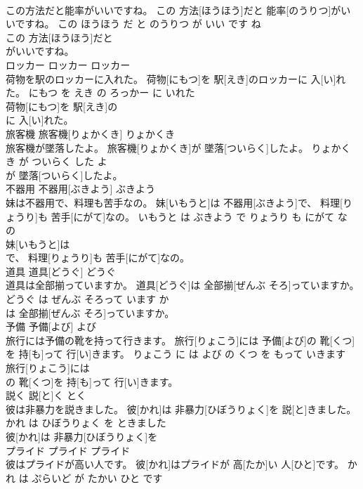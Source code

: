 \documentclass[8pt]{extreport}
\begin{document}
\begin{CJK}{UTF8}{min}
\\	この方法だと能率がいいですね。	この 方法[ほうほう]だと 能率[のうりつ]がいいですね。	この ほうほう だ と のうりつ が いい です ね	
\\	この 方法[ほうほう]だと
\\	がいいですね。			
\\	ロッカー	ロッカー	ロッカー	
\\	荷物を駅のロッカーに入れた。	荷物[にもつ]を 駅[えき]のロッカーに 入[い]れた。	にもつ を えき の ろっかー に いれた	
\\	荷物[にもつ]を 駅[えき]の
\\	に 入[い]れた。			
\\	旅客機	旅客機[りょかくき]	りょかくき	
\\	旅客機が墜落したよ。	旅客機[りょかくき]が 墜落[ついらく]したよ。	りょかくき が ついらく した よ	
\\	が 墜落[ついらく]したよ。			
\\	不器用	不器用[ぶきよう]	ぶきよう	
\\	妹は不器用で、料理も苦手なの。	妹[いもうと]は 不器用[ぶきよう]で、 料理[りょうり]も 苦手[にがて]なの。	いもうと は ぶきよう で りょうり も にがて な の	
\\	妹[いもうと]は
\\	で、 料理[りょうり]も 苦手[にがて]なの。			
\\	道具	道具[どうぐ]	どうぐ	
\\	道具は全部揃っていますか。	道具[どうぐ]は 全部揃[ぜんぶ そろ]っていますか。	どうぐ は ぜんぶ そろって います か	
\\	は 全部揃[ぜんぶ そろ]っていますか。			
\\	予備	予備[よび]	よび	
\\	旅行には予備の靴を持って行きます。	旅行[りょこう]には 予備[よび]の 靴[くつ]を 持[も]って 行[い]きます。	りょこう に は よび の くつ を もって いきます	
\\	旅行[りょこう]には
\\	の 靴[くつ]を 持[も]って 行[い]きます。			
\\	説く	説[と]く	とく	
\\	彼は非暴力を説きました。	彼[かれ]は 非暴力[ひぼうりょく]を 説[と]きました。	かれ は ひぼうりょく を ときました	
\\	彼[かれ]は 非暴力[ひぼうりょく]を
\\	プライド	プライド	プライド	
\\	彼はプライドが高い人です。	彼[かれ]はプライドが 高[たか]い 人[ひと]です。	かれ は ぷらいど が たかい ひと です	

\end{CJK}
\end{document}
